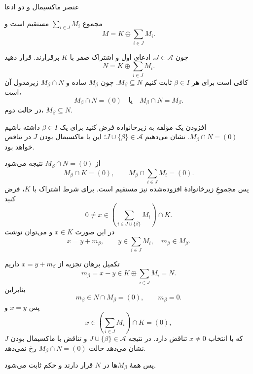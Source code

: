\begin{frame}[t]{عنصر ماکسیمال و دو ادعا}
    \label{lec05:maximal-family-claims}
    \begin{claim}
        مجموع $\sum_{i\in J}M_i$ مستقیم است و
        \[
            M=K\oplus\sum_{i\in J}M_i.
        \]
    \end{claim}
    چون $J\in\mathcal{A}$، ادعای اول و اشتراک صفر با $K$ برقرارند.
    قرار دهید
    \[
        N=K\oplus\sum_{i\in J}M_i.
    \]
    کافی است برای هر $\beta\in I$ ثابت کنیم $M_\beta\subseteq N$.
    چون $M_\beta$ ساده و $M_\beta\cap N$ زیرمدول آن است،
    \[
        M_\beta\cap N=(0)
        \quad\text{یا}\quad
        M_\beta\cap N=M_\beta.
    \]
    در حالت دوم، $M_\beta\subseteq N$.
\end{frame}

\begin{frame}[t]{افزودن یک مؤلفه به زیرخانواده}
    \label{lec05:adjoin-component}
    فرض کنید برای یک $\beta\in I$ داشته باشیم $M_\beta\cap N=(0)$.
    نشان می‌دهیم $J\cup\{\beta\}\in\mathcal{A}$؛
    این با ماکسیمال بودن $J$ در تناقض خواهد بود.

    از $M_\beta\cap N=(0)$ نتیجه می‌شود
    \[
        M_\beta\cap K=(0),
        \qquad
        M_\beta\cap\sum_{i\in J}M_i=(0).
    \]
    پس مجموعِ زیرخانوادهٔ افزوده‌شده نیز مستقیم است.
    برای شرط اشتراک با $K$، فرض کنید
    \[
        0\neq x\in\left(\sum_{i\in J\cup\{\beta\}}M_i\right)\cap K.
    \]
    در این صورت $x\in K$ و می‌توان نوشت
    \[
        x=y+m_\beta,
        \qquad y\in\sum_{i\in J}M_i,
        \quad m_\beta\in M_\beta.
    \]
\end{frame}

\begin{frame}[t]{تکمیل برهان تجزیه}
    \label{lec05:complement-proof-end}
    از $x=y+m_\beta$ داریم
    \[
        m_\beta=x-y\in K\oplus\sum_{i\in J}M_i=N.
    \]
    بنابراین
    \[
        m_\beta\in N\cap M_\beta=(0),
        \qquad m_\beta=0.
    \]
    پس $x=y$ و
    \[
        x\in\left(\sum_{i\in J}M_i\right)\cap K=(0),
    \]
    که با انتخاب $x\neq0$ تناقض دارد.
    در نتیجه $J\cup\{\beta\}\in\mathcal{A}$ و تناقض با ماکسیمال بودن $J$
    نشان می‌دهد حالت $M_\beta\cap N=(0)$ رخ نمی‌دهد.

    پس همهٔ $M_\beta$ها در $N$ قرار دارند و حکم ثابت می‌شود.
\end{frame}

